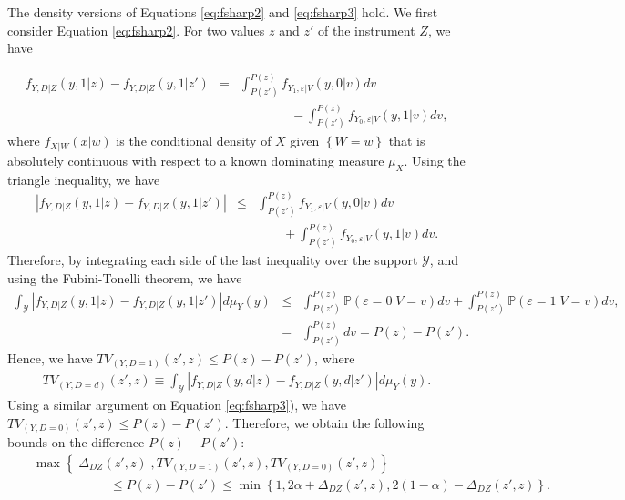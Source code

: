 \documentclass[11pt,reqno]{amsart}
\theoremstyle{plain}
\numberwithin{equation}{section}
\begin{document}
The density versions of Equations \eqref{eq:fsharp2} and \eqref{eq:fsharp3} hold. We first consider Equation \eqref{eq:fsharp2}. For two values $z$ and $z'$ of the instrument $Z$, we have


 
\begin{eqnarray*}
f_{Y,D\vert Z}\left(y, 1 \vert z\right) - f_{Y,D\vert Z}\left(y, 1 \vert z'\right)&=& \int^{P(z)}_{P(z')}f_{Y_1,\varepsilon\vert V}(y,0\vert v)dv\\
&&\qquad \qquad - \int^{P(z)}_{P(z')}f_{Y_0,\varepsilon\vert V}(y,1\vert v)dv,
\end{eqnarray*}
where $f_{X\vert W}\left(x \vert w\right)$ is the conditional density of $X$ given $\left\{W=w\right\}$ that is absolutely continuous with respect to a known dominating measure $\mu_{X}$.
Using the triangle inequality, we have
\begin{eqnarray*}
\left \lvert f_{Y,D\vert Z}\left(y, 1 \vert z\right) - f_{Y,D\vert Z}\left(y, 1 \vert z'\right) \right \rvert  &\leq&  \int^{P(z)}_{P(z')}f_{Y_1,\varepsilon\vert V}(y,0\vert v)dv\\
 && \qquad + \int^{P(z)}_{P(z')}f_{Y_0,\varepsilon\vert V}(y,1\vert v)dv.
\end{eqnarray*}
Therefore, by integrating each side of the last inequality over the support $\mathcal Y$, and using the Fubini-Tonelli theorem, we have
\begin{eqnarray*}
\int_{\mathcal Y}\left \lvert f_{Y,D\vert Z}\left(y, 1 \vert z\right) - f_{Y,D\vert Z}\left(y, 1 \vert z'\right) \right \rvert d \mu_{Y}(y) &\leq&  \int^{P(z)}_{P(z')}\mathbb P(\varepsilon=0\vert V=v)dv+\int^{P(z)}_{P(z')}\mathbb P(\varepsilon=1\vert V=v)dv,\\
&=& \int^{P(z)}_{P(z')}dv= P(z)-P(z').
\end{eqnarray*}
Hence, we have $TV_{(Y,D=1)}(z',z) \leq P(z)-P(z')$, where 
\begin{eqnarray*}
TV_{(Y,D=d)}(z',z) \equiv \int_{\mathcal Y}\left \lvert f_{Y,D\vert Z}\left(y, d \vert z\right) - f_{Y,D\vert Z}\left(y, d \vert z'\right) \right \rvert d \mu_{Y}(y).
\end{eqnarray*}
Using a similar argument on Equation \eqref{eq:fsharp3}), we have $TV_{(Y,D=0)}(z',z) \leq P(z)-P(z')$.
Therefore, we obtain the following bounds on the difference $P(z)-P(z')$:
\begin{eqnarray*}
&&\max\left\{\left \lvert \Delta_{DZ}(z',z)\right \rvert, TV_{(Y,D=1)}(z',z), TV_{(Y,D=0)}(z',z)\right\}\\
 && \qquad \qquad \qquad \leq P(z)-P(z') \leq \min\left\{1,2\alpha+\Delta_{DZ}(z',z), 2(1-\alpha)-\Delta_{DZ}(z',z)\right\}. 
\end{eqnarray*}
\end{document}

